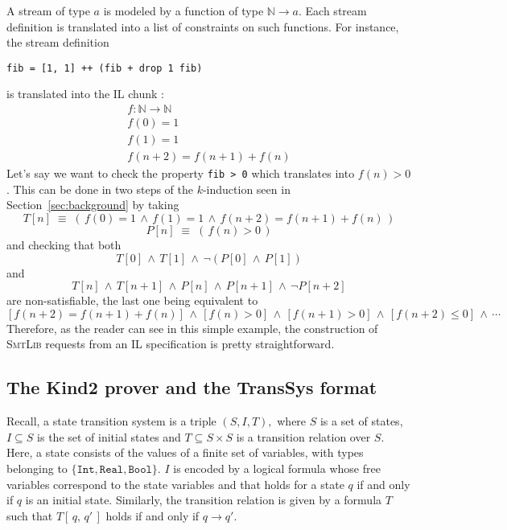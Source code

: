 A stream of type $a$ is modeled by a function of type $\mathbb{N} \to a$. Each stream definition is translated into a list of constraints on such functions. For instance, the stream definition
\begin{lstlisting}
fib = [1, 1] ++ (fib + drop 1 fib)
\end{lstlisting}
is translated into the IL chunk :
$$
\begin{array}{c}
f : \mathbb{N} \to \mathbb{N} \\
f(0) = 1 \\
f(1) = 1 \\
f(n + 2) = f(n + 1) + f(n)
\end{array}
$$
Let's say we want to check the property \texttt{fib > 0} which translates into $f(n) > 0$. This can be done in two steps of the $k$-induction seen in Section~\ref{sec:background} by taking \[T[n] \;\equiv\; \left(\, f(0) = 1 \,\wedge\,
f(1) = 1 \,\wedge\, f(n + 2) = f(n + 1) + f(n) \,\right) \] \[P[n] \;\equiv\; \left(\, f(n) > 0 \,\right) \]
and checking that both \[T[0] \,\wedge\, T[1] \,\wedge\, \neg \left( P[0] \,\wedge\, P[1] \right) \] and \[T[n] \,\wedge\, T[n + 1] \,\wedge\, P[n] \,\wedge\, P[n + 1] \,\wedge\, \neg P[n + 2] \]
are non-satisfiable, the last one being equivalent to \[ \left[f(n+2) = f(n+1) + f(n)\right] \,\wedge\, \left[f(n) > 0\right] \,\wedge\, \left[f(n + 1) > 0\right] \,\wedge\, \left[f(n + 2) \leq 0\right]   \,\wedge\, \cdots \]
Therefore, as the reader can see in this simple example, the construction of \textsc{SmtLib} requests from an IL specification is pretty straightforward.


\subsection{The Kind2 prover and the {TransSys} format}

Recall, a state transition system is a triple $(S,I,T),$
where $S$ is a set of states, $I \subseteq S$ is the set of initial
states and $T \subseteq S \times S $ is a transition relation over $S$.
Here, a state consists of  the values of a finite set of variables, with types belonging to $\{ \texttt{Int}, \texttt{Real},  \texttt{Bool}\}$. $I$ is encoded by a logical formula whose free variables correspond to the state variables and that holds for a state $q$ if and only if $q$ is an initial state. Similarly, the transition relation is given by a formula $T$ such that $T\left[\, q, \, q' \,\right]$ holds if and only if $q \rightarrow q'$. 

